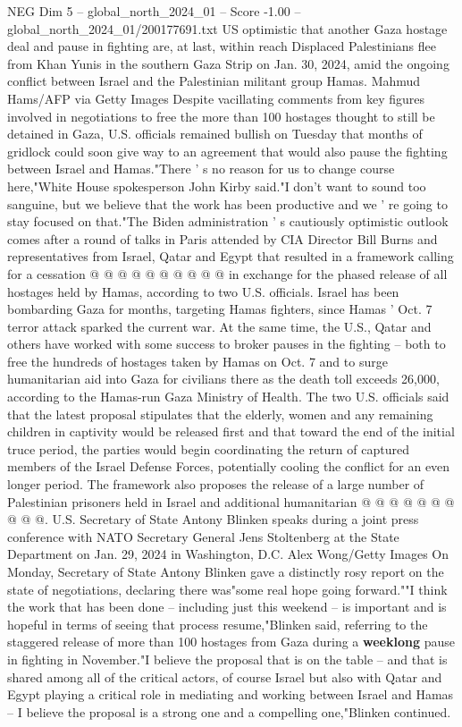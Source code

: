 \begin{textsample}{NEG Dim 5 – global\_north\_2024\_01 – Score -1.00 – global\_north\_2024\_01/200177691.txt}  \label{ex:f5_neg_314}
US optimistic that another Gaza hostage deal and pause in fighting are, at last, within reach Displaced Palestinians flee from Khan Yunis in the southern Gaza Strip on Jan. 30, 2024, amid the ongoing conflict between Israel and the Palestinian militant group Hamas.
Mahmud Hams/AFP via Getty Images Despite vacillating comments from key figures involved in negotiations to free the more than 100 hostages thought to still be detained in Gaza, U.S. officials remained bullish on Tuesday that months of gridlock could soon give way to an agreement that would also pause the fighting between Israel and Hamas."There ' s no reason for us to change course here,"White House spokesperson John Kirby said."I don't want to sound too sanguine, but we believe that the work has been productive and we ' re going to stay focused on that."The Biden administration ' s cautiously optimistic outlook comes after a round of talks in Paris attended by CIA Director Bill Burns and representatives from Israel, Qatar and Egypt that resulted in a framework calling for a cessation @ @ @ @ @ @ @ @ @ @ in exchange for the phased release of all hostages held by Hamas, according to two U.S. officials.
Israel has been bombarding Gaza for months, targeting Hamas fighters, since Hamas ' Oct. 7 terror attack sparked the current war.
At the same time, the U.S., Qatar and others have worked with some success to broker pauses in the fighting -- both to free the hundreds of hostages taken by Hamas on Oct. 7 and to surge humanitarian aid into Gaza for civilians there as the death toll exceeds 26,000, according to the Hamas-run Gaza Ministry of Health.
The two U.S. officials said that the latest proposal stipulates that the elderly, women and any remaining children in captivity would be released first and that toward the end of the initial truce period, the parties would begin coordinating the return of captured members of the Israel Defense Forces, potentially cooling the conflict for an even longer period.
The framework also proposes the release of a large number of Palestinian prisoners held in Israel and additional humanitarian @ @ @ @ @ @ @ @ @ @.
U.S.
Secretary of State Antony Blinken speaks during a joint press conference with NATO Secretary General Jens Stoltenberg at the State Department on Jan. 29, 2024 in Washington, D.C.
Alex Wong/Getty Images On Monday, Secretary of State Antony Blinken gave a distinctly rosy report on the state of negotiations, declaring there was"some real hope going forward.""I think the work that has been done -- including just this weekend -- is important and is hopeful in terms of seeing that process resume,"Blinken said, referring to the staggered release of more than 100 hostages from Gaza during a \textbf{weeklong} pause in fighting in November."I believe the proposal that is on the table -- and that is shared among all of the critical actors, of course Israel but also with Qatar and Egypt playing a critical role in mediating and working between Israel and Hamas -- I believe the proposal is a strong one and a compelling one,"Blinken continued.

\end{textsample}
